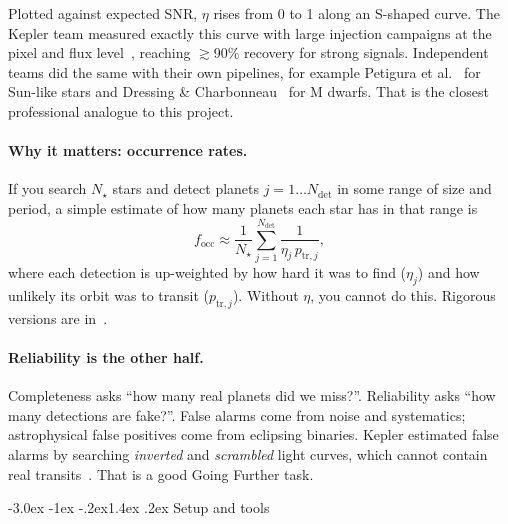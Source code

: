 \documentclass[11pt,a4paper]{article}
\makeatletter
\renewcommand\section{\@startsection{section}{1}{\z@}%
  {-3.0ex \@plus -1ex \@minus -.2ex}{1.4ex \@plus .2ex}%
  {\normalfont\sffamily\LARGE\bfseries\color{navy}}}
\makeatother
\begin{document}
Plotted against expected SNR, \(\eta\) rises from 0 to 1 along an S-shaped curve. The Kepler team measured exactly this
curve with large injection campaigns at the pixel and flux level~\citep{Christiansen2013,Christiansen2015,Christiansen2016,Christiansen2020},
reaching \(\gtrsim\)90\% recovery for strong signals. Independent teams did the same with their own pipelines, for example
Petigura et al.~\citep{Petigura2013} for Sun-like stars and Dressing \& Charbonneau~\citep{Dressing2015} for M dwarfs.
That is the closest professional analogue to this project.

\paragraph{Why it matters: occurrence rates.} If you search \(N_\star\) stars and detect planets \(j=1\ldots N_\text{det}\) in some
range of size and period, a simple estimate of how many planets each star has in that range is
\begin{equation}
  f_\text{occ} \approx \frac{1}{N_\star}\sum_{j=1}^{N_\text{det}} \frac{1}{\eta_j\,p_{\text{tr},j}},
\end{equation}
where each detection is up-weighted by how hard it was to find (\(\eta_j\)) and how unlikely its orbit was to transit
(\(p_{\text{tr},j}\)). Without \(\eta\), you cannot do this. Rigorous versions are in~\citep{Burke2015,Thompson2018}.

\paragraph{Reliability is the other half.} Completeness asks ``how many real planets did we miss?''. Reliability asks ``how many
detections are fake?''. False alarms come from noise and systematics; astrophysical false positives come from eclipsing binaries.
Kepler estimated false alarms by searching \emph{inverted} and \emph{scrambled} light curves, which cannot contain real
transits~\citep{Thompson2018}. That is a good Going Further task.

\section{Setup and tools}
\label{sec:setup}
\end{document}
